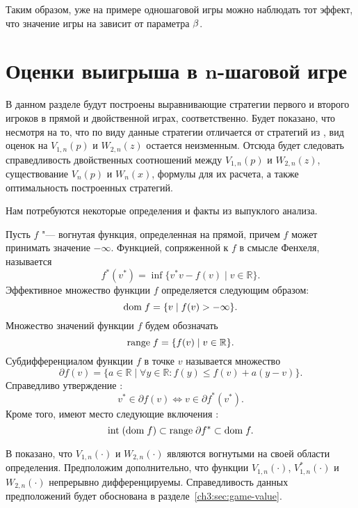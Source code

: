 {Таким образом, уже на примере одношаговой игры можно наблюдать тот эффект, что значение игры на зависит от параметра $\beta$.


\section{Оценки выигрыша в $\mathbf{n}$-шаговой игре}
\label{ch3:sec:value-bounds}

В данном разделе будут построены выравнивающие стратегии первого и второго игроков в прямой и двойственной играх, соответственно.
Будет показано, что несмотря на то, что по виду данные стратегии отличается от стратегий из \cite{demeyer02}, вид оценок на $V_{1,n}(p)$ и $W_{2,n}(z)$ остается неизменным.
Отсюда будет следовать справедливость двойственных соотношений между $V_{1,n}(p)$ и $W_{2,n}(z)$, существование $V_n(p)$ и $W_n(x)$, формулы для их расчета, а также оптимальность построенных стратегий.

Нам потребуются некоторые определения и факты из выпуклого анализа.

Пусть $f$ "--- вогнутая функция, определенная на прямой, причем $f$ может принимать значение $-\infty$.
Функцией, сопряженной к $f$ в смысле Фенхеля, называется
\begin{equation*}
  f^*(v^*) = \inf \{ v^* v - f(v) \;|\; v \in \mathbb{R} \}.
\end{equation*}
Эффективное множество функции $f$ определяется следующим образом:
\[
\mathrm{dom\;} f = \{ v \;|\; f(v) > -\infty \}.
\]
Множество значений функции $f$ будем обозначать \[
\mathrm{range\;} f = \{ f(v) \;|\; v \in \mathbb{R} \}.
\]
%
Субдифференциалом функции $f$ в точке $v$ называется множество
\begin{equation*}
  \partial f(v) =
  \{ a \in \mathbb{R} \;|\; \forall y \in \mathbb{R}: f(y) \leqslant f(v) + a(y-v) \}.
\end{equation*}
%
Справедливо утверждение \cite[Теорема 23.5]{rockafellar73}:
\begin{equation}\label{ch3:eq:subdiff-props}
  v^* \in \partial f(v) \iff v \in \partial f^*(v^*).
\end{equation}
Кроме того, имеют место следующие включения \cite[\S~24]{rockafellar73}:
\begin{equation}\label{ch3:eq:dual-range}
  \mathrm{int} \; (\mathrm{dom\;} f) \subset \mathrm{range\;} \partial f^* \subset \mathrm{dom\;} f.
\end{equation}

В \cite{demeyer02} показано, что $V_{1,n}(\cdot)$ и $W_{2,n}(\cdot)$ являются вогнутыми на своей области определения.
Предположим дополнительно, что функции $V_{1,n}(\cdot)$, $V^*_{1,n}(\cdot)$ и $W_{2,n}(\cdot)$ непрерывно дифференцируемы.
Справедливость данных предположений будет обоснована в разделе~\ref{ch3:sec:game-value}.


}
